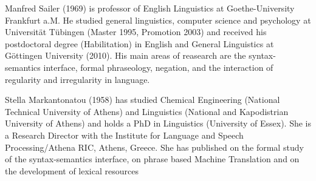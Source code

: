 Manfred Sailer (1969) is professor of English Linguistics at
Goethe-University Frankfurt a.M. He studied general linguistics,
computer science and psychology at Universität Tübingen (Master 1995,
Promotion 2003) and received his postdoctoral degree (Habilitation) in
English and General Linguistics at Göttingen University (2010). His main
areas of reasearch are the syntax-semantics interface, formal
phraseology, negation, and the interaction of regularity and
irregularity in language.

Stella Markantonatou (1958) has studied Chemical Engineering (National
Technical University of Athens) and Linguistics (National and
Kapodistrian University of Athens) and holds a PhD in Linguistics
(University of Essex). She is a Research Director with the Institute for
Language and Speech Processing/Athena RIC, Athens, Greece. She has
published on the formal study of the syntax-semantics interface, on
phrase based Machine Translation and on the development of lexical
resources
